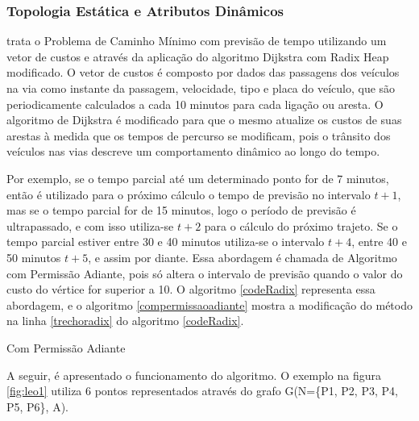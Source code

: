 \subsubsection{Topologia Estática e Atributos Dinâmicos}
\label{subsec:limitesuperior}
\cite{leonard} trata o Problema de Caminho Mínimo com previsão de tempo utilizando um vetor de custos e
através da aplicação do algoritmo Dijkstra com Radix Heap modificado. O vetor de custos é composto por dados das passagens 
dos veículos na via como instante da passagem, velocidade, tipo e placa do veículo, que são periodicamente calculados
a cada 10 minutos para cada ligação ou aresta. O algoritmo de Dijkstra é modificado para que o mesmo atualize os custos
de suas arestas à medida que os tempos de percurso se modificam, pois o trânsito dos veículos nas vias descreve um
comportamento dinâmico ao longo do tempo.

Por exemplo, se o tempo parcial até um determinado ponto for de 7 minutos, então
é utilizado para o próximo cálculo o tempo de previsão no intervalo $t + 1$, mas se o tempo parcial for de 15 minutos, logo
o período de previsão é ultrapassado, e com isso utiliza-se $t + 2$ para o cálculo do próximo trajeto. Se o tempo parcial
estiver entre 30 e 40 minutos utiliza-se o intervalo $t + 4$, entre 40 e 50 minutos $t + 5$, e assim por diante.
Essa abordagem é chamada de Algoritmo com Permissão Adiante, pois só altera o intervalo de previsão quando o valor do custo
do vértice for superior a 10.
O algoritmo \ref{codeRadix} representa essa abordagem, e o algoritmo \ref{compermissaoadiante} mostra a modificação
do método na linha \ref{trechoradix} do algoritmo \ref{codeRadix}.

\begin{algorithm}[h!]
\caption{Com Permissão Adiante}
\label{compermissaoadiante}
\end{algorithm}
\FloatBarrier

A seguir, é apresentado o funcionamento do algoritmo. O exemplo na figura \ref{fig:leo1} utiliza
6 pontos representados através do grafo G(N=\{P1, P2, P3, P4, P5, P6\}, A).

